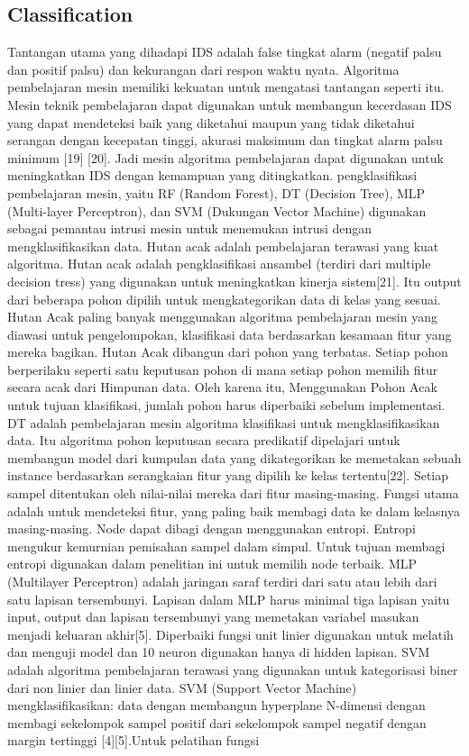 \documentclass[conference]{IEEEtran}
\begin{document}
\subsection{Classification}
Tantangan utama yang dihadapi IDS adalah false tingkat alarm (negatif palsu dan positif palsu) dan kekurangan dari respon waktu nyata. Algoritma pembelajaran mesin memiliki kekuatan untuk mengatasi tantangan seperti itu. Mesin teknik pembelajaran dapat digunakan untuk membangun kecerdasan IDS yang dapat mendeteksi baik yang diketahui maupun yang tidak diketahui serangan dengan kecepatan tinggi, akurasi maksimum dan tingkat alarm palsu minimum [19]\cite{masoodi2019symmetric} [20]\cite{jabbar2017rfaode}. Jadi mesin algoritma pembelajaran dapat digunakan untuk meningkatkan IDS dengan kemampuan yang ditingkatkan. pengklasifikasi pembelajaran mesin, yaitu RF (Random Forest), DT (Decision Tree), MLP (Multi-layer Perceptron), dan SVM (Dukungan Vector Machine) digunakan sebagai pemantau intrusi mesin untuk menemukan intrusi dengan mengklasifikasikan data. Hutan acak adalah pembelajaran terawasi yang kuat algoritma. Hutan acak adalah pengklasifikasi ansambel (terdiri dari multiple decision tress) yang digunakan untuk meningkatkan kinerja sistem[21]\cite{rutkowski2012decision}. Itu output dari beberapa pohon dipilih untuk mengkategorikan data di kelas yang sesuai. Hutan Acak paling banyak menggunakan algoritma pembelajaran mesin yang diawasi untuk pengelompokan, klasifikasi data berdasarkan kesamaan fitur yang mereka bagikan. Hutan Acak dibangun dari pohon yang terbatas. Setiap pohon berperilaku seperti satu keputusan pohon di mana setiap pohon memilih fitur secara acak dari Himpunan data. Oleh karena itu, Menggunakan Pohon Acak untuk tujuan klasifikasi, jumlah pohon harus diperbaiki sebelum implementasi. DT adalah pembelajaran mesin algoritma klasifikasi untuk mengklasifikasikan data. Itu algoritma pohon keputusan secara predikatif dipelajari untuk membangun model dari kumpulan data yang dikategorikan ke memetakan sebuah instance berdasarkan serangkaian fitur yang dipilih ke kelas tertentu[22]\cite{alsmadi2017sdn}. Setiap sampel ditentukan oleh nilai-nilai mereka dari fitur masing-masing. Fungsi utama adalah untuk mendeteksi fitur, yang paling baik membagi data ke dalam kelasnya masing-masing. Node dapat dibagi dengan menggunakan entropi. Entropi mengukur kemurnian pemisahan sampel dalam simpul. Untuk tujuan membagi entropi digunakan dalam penelitian ini untuk memilih node terbaik. MLP (Multilayer Perceptron) adalah jaringan saraf terdiri dari satu atau lebih dari satu lapisan tersembunyi. Lapisan dalam MLP harus minimal tiga lapisan yaitu input, output dan lapisan tersembunyi yang memetakan variabel masukan menjadi keluaran akhir[5]\cite{sain1996nature}. Diperbaiki fungsi unit linier digunakan untuk melatih dan menguji model dan 10 neuron digunakan hanya di hidden lapisan. SVM adalah algoritma pembelajaran terawasi yang digunakan untuk kategorisasi biner dari non linier dan linier data. SVM (Support Vector Machine) mengklasifikasikan: data dengan membangun hyperplane N-dimensi dengan membagi sekelompok sampel positif dari sekelompok sampel negatif dengan margin tertinggi [4]\cite{yang2015evaluating}[5]\cite{sain1996nature}.Untuk pelatihan fungsi 
\end{document}
